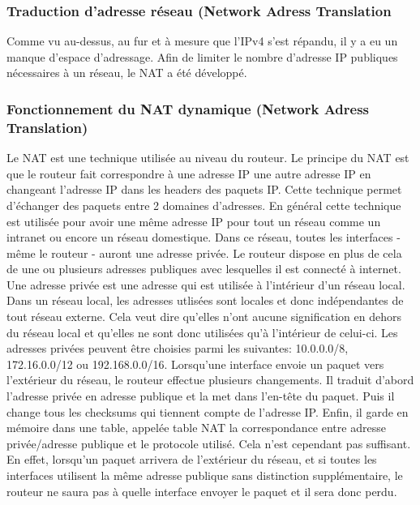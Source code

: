 \subsubsection{Traduction d'adresse réseau (Network Adress Translation}
Comme vu au-dessus, au fur et à mesure que l'IPv4 s'est répandu, il y a eu un manque
d'espace d'adressage. Afin de limiter le nombre d'adresse IP publiques nécessaires
à un réseau, le NAT a été développé.

\subsubsection{Fonctionnement du NAT dynamique (Network Adress Translation)}
Le NAT est une technique utilisée au niveau du routeur. Le principe du NAT est
que le routeur fait correspondre à une adresse IP une autre adresse IP en
changeant l'adresse IP dans les headers des paquets IP. Cette technique permet
d'échanger des paquets entre 2 domaines d'adresses. En général cette technique
est utilisée pour avoir une même adresse IP pour tout un réseau comme un 
intranet ou encore un réseau domestique. Dans ce réseau, toutes les interfaces
- même le routeur - auront une adresse privée. Le routeur dispose en plus de
cela de une ou plusieurs adresses publiques avec lesquelles il est connecté à
internet. Une adresse privée est une adresse qui est utilisée à l'intérieur
d'un réseau local. Dans un réseau local, les adresses utlisées sont locales et donc
indépendantes de tout réseau externe. Cela veut dire qu'elles n'ont aucune
signification en dehors du réseau local et qu'elles ne sont donc utilisées qu'à
l'intérieur de celui-ci. Les adresses privées peuvent être choisies parmi les
suivantes: 10.0.0.0/8, 172.16.0.0/12 ou 192.168.0.0/16.
\smallbreak
Lorsqu'une interface envoie un paquet vers l'extérieur du réseau, le routeur
effectue plusieurs changements. Il traduit d'abord l'adresse privée en adresse
publique et la met dans l'en-tête du paquet. Puis il change tous les checksums
qui tiennent compte de l'adresse IP. Enfin, il garde en mémoire dans une table,
 appelée table NAT la correspondance entre adresse privée/adresse publique et le
protocole utilisé.
\newline
Cela n'est cependant pas suffisant. En effet, lorsqu'un paquet arrivera de
l'extérieur du réseau, et si toutes les interfaces utilisent la même adresse
publique sans distinction supplémentaire, le routeur ne saura pas à quelle
interface envoyer le paquet et il sera donc perdu.

